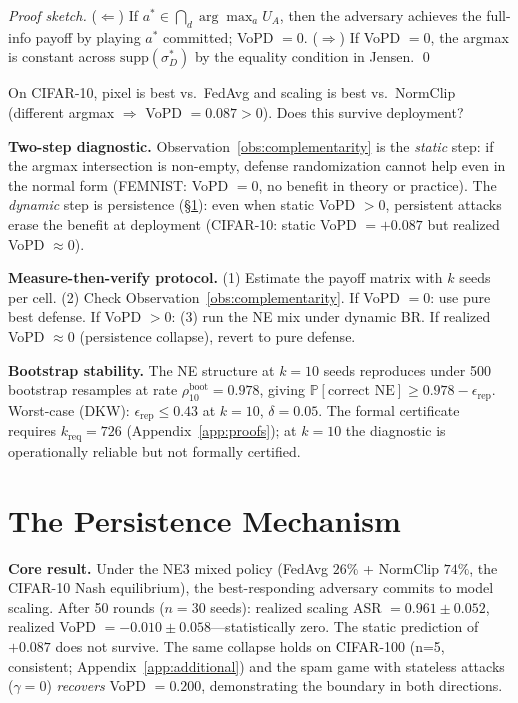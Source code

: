 \documentclass{article}
\newcommand{\UA}{U_A}
\begin{document}
\begin{proof}[Proof sketch]
($\Leftarrow$) If $a^* \in \bigcap_d \arg\max_a \UA$, then the adversary achieves the full-info payoff by playing $a^*$ committed; VoPD $= 0$. ($\Rightarrow$) If VoPD $= 0$, the argmax is constant across $\mathrm{supp}(\sigma_D^*)$ by the equality condition in Jensen. \qed
\end{proof}

On CIFAR-10, pixel is best vs.\ FedAvg and scaling is best vs.\ NormClip (different argmax $\Rightarrow$ VoPD $= 0.087 > 0$). Does this survive deployment?

\textbf{Two-step diagnostic.} Observation~\ref{obs:complementarity} is the \emph{static} step: if the argmax intersection is non-empty, defense randomization cannot help even in the normal form (FEMNIST: VoPD $= 0$, no benefit in theory or practice). The \emph{dynamic} step is persistence (§\ref{sec:persistence}): even when static VoPD $> 0$, persistent attacks erase the benefit at deployment (CIFAR-10: static VoPD $= +0.087$ but realized VoPD $\approx 0$).

\textbf{Measure-then-verify protocol.}\label{alg:mtr} (1) Estimate the payoff matrix with $k$ seeds per cell. (2) Check Observation~\ref{obs:complementarity}. If VoPD $= 0$: use pure best defense. If VoPD $> 0$: (3) run the NE mix under dynamic BR. If realized VoPD $\approx 0$ (persistence collapse), revert to pure defense.

\textbf{Bootstrap stability.} The NE structure at $k=10$ seeds reproduces under 500 bootstrap resamples at rate $\rho_{10}^{\text{boot}} = 0.978$, giving $\mathbb{P}[\text{correct NE}] \geq 0.978 - \epsilon_{\text{rep}}$. Worst-case (DKW): $\epsilon_{\text{rep}} \leq 0.43$ at $k=10$, $\delta=0.05$. The formal certificate requires $k_{\text{req}} = 726$ (Appendix~\ref{app:proofs}); at $k=10$ the diagnostic is operationally reliable but not formally certified.

\section{The Persistence Mechanism}
\label{sec:persistence}

\textbf{Core result.} Under the NE3 mixed policy (FedAvg $26\%$ + NormClip $74\%$, the CIFAR-10 Nash equilibrium), the best-responding adversary commits to model scaling. After 50 rounds ($n=30$ seeds): realized scaling ASR $= 0.961 \pm 0.052$, realized VoPD $= -0.010 \pm 0.058$---statistically zero. The static prediction of $+0.087$ does not survive. The same collapse holds on CIFAR-100 (n=5, consistent; Appendix~\ref{app:additional}) and the spam game with stateless attacks ($\gamma=0$) \emph{recovers} VoPD $= 0.200$, demonstrating the boundary in both directions.
\end{document}
